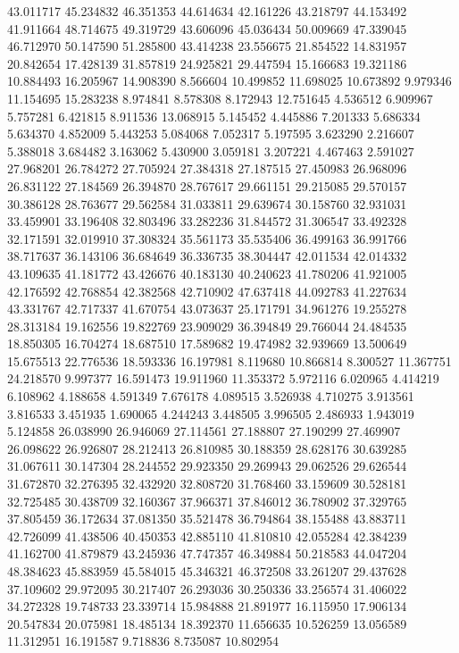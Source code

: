43.011717
45.234832
46.351353
44.614634
42.161226
43.218797
44.153492
41.911664
48.714675
49.319729
43.606096
45.036434
50.009669
47.339045
46.712970
50.147590
51.285800
43.414238
23.556675
21.854522
14.831957
20.842654
17.428139
31.857819
24.925821
29.447594
15.166683
19.321186
10.884493
16.205967
14.908390
8.566604
10.499852
11.698025
10.673892
9.979346
11.154695
15.283238
8.974841
8.578308
8.172943
12.751645
4.536512
6.909967
5.757281
6.421815
8.911536
13.068915
5.145452
4.445886
7.201333
5.686334
5.634370
4.852009
5.443253
5.084068
7.052317
5.197595
3.623290
2.216607
5.388018
3.684482
3.163062
5.430900
3.059181
3.207221
4.467463
2.591027
27.968201
26.784272
27.705924
27.384318
27.187515
27.450983
26.968096
26.831122
27.184569
26.394870
28.767617
29.661151
29.215085
29.570157
30.386128
28.763677
29.562584
31.033811
29.639674
30.158760
32.931031
33.459901
33.196408
32.803496
33.282236
31.844572
31.306547
33.492328
32.171591
32.019910
37.308324
35.561173
35.535406
36.499163
36.991766
38.717637
36.143106
36.684649
36.336735
38.304447
42.011534
42.014332
43.109635
41.181772
43.426676
40.183130
40.240623
41.780206
41.921005
42.176592
42.768854
42.382568
42.710902
47.637418
44.092783
41.227634
43.331767
42.717337
41.670754
43.073637
25.171791
34.961276
19.255278
28.313184
19.162556
19.822769
23.909029
36.394849
29.766044
24.484535
18.850305
16.704274
18.687510
17.589682
19.474982
32.939669
13.500649
15.675513
22.776536
18.593336
16.197981
8.119680
10.866814
8.300527
11.367751
24.218570
9.997377
16.591473
19.911960
11.353372
5.972116
6.020965
4.414219
6.108962
4.188658
4.591349
7.676178
4.089515
3.526938
4.710275
3.913561
3.816533
3.451935
1.690065
4.244243
3.448505
3.996505
2.486933
1.943019
5.124858
26.038990
26.946069
27.114561
27.188807
27.190299
27.469907
26.098622
26.926807
28.212413
26.810985
30.188359
28.628176
30.639285
31.067611
30.147304
28.244552
29.923350
29.269943
29.062526
29.626544
31.672870
32.276395
32.432920
32.808720
31.768460
33.159609
30.528181
32.725485
30.438709
32.160367
37.966371
37.846012
36.780902
37.329765
37.805459
36.172634
37.081350
35.521478
36.794864
38.155488
43.883711
42.726099
41.438506
40.450353
42.885110
41.810810
42.055284
42.384239
41.162700
41.879879
43.245936
47.747357
46.349884
50.218583
44.047204
48.384623
45.883959
45.584015
45.346321
46.372508
33.261207
29.437628
37.109602
29.972095
30.217407
26.293036
30.250336
33.256574
31.406022
34.272328
19.748733
23.339714
15.984888
21.891977
16.115950
17.906134
20.547834
20.075981
18.485134
18.392370
11.656635
10.526259
13.056589
11.312951
16.191587
9.718836
8.735087
10.802954
